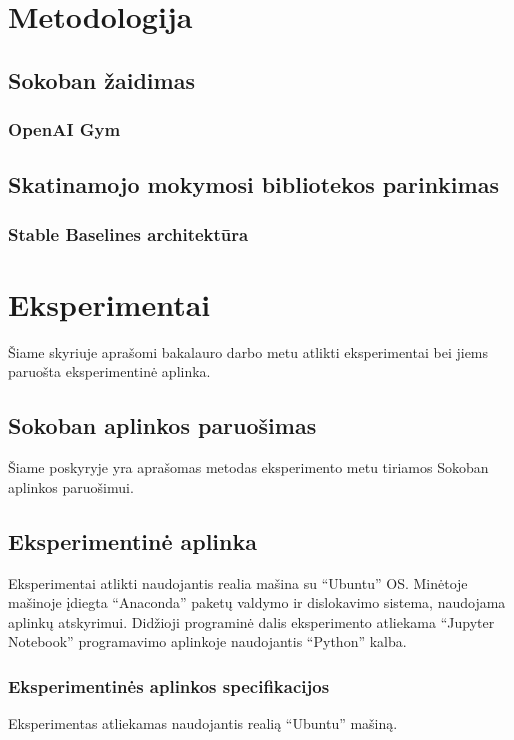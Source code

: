 \documentclass{VUMIFPSbakalaurinis}
\begin{document}
\section{Metodologija}
\subsection{Sokoban žaidimas}
\subsubsection{OpenAI Gym}

\subsection{Skatinamojo mokymosi bibliotekos parinkimas}
\subsubsection{Stable Baselines architektūra}

\section{Eksperimentai}
Šiame skyriuje aprašomi bakalauro darbo metu atlikti eksperimentai bei jiems paruošta eksperimentinė aplinka.

\subsection{Sokoban aplinkos paruošimas}
Šiame poskyryje yra aprašomas metodas eksperimento metu tiriamos Sokoban aplinkos paruošimui.
\subsubsection{}


\subsection{Eksperimentinė aplinka}
Eksperimentai atlikti naudojantis realia mašina su \enquote{Ubuntu} OS. Minėtoje mašinoje įdiegta \enquote{Anaconda} paketų valdymo ir dislokavimo sistema, naudojama aplinkų atskyrimui. Didžioji programinė dalis eksperimento atliekama \enquote{Jupyter Notebook} programavimo aplinkoje naudojantis \enquote{Python} kalba.

\subsubsection{Eksperimentinės aplinkos specifikacijos}
Eksperimentas atliekamas naudojantis realią \enquote{Ubuntu} mašiną.
\end{document}
